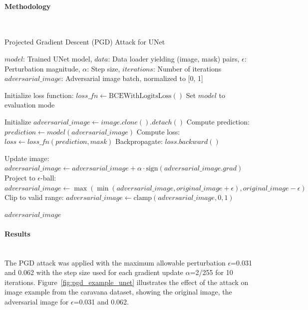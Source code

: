 \documentclass[../main.tex]{subfiles}
\begin{document}
\paragraph{Methodology}\leavevmode\\

\begin{breakablealgorithm}{Projected Gradient Descent (PGD) Attack for UNet}
\begin{algorithmic}[1]
\Require $model$: Trained UNet model, $data$: Data loader yielding (image, mask) pairs, $\epsilon$: Perturbation magnitude, $\alpha$: Step size, $iterations$: Number of iterations
\Ensure $adversarial\_image$: Adversarial image batch, normalized to [0, 1]

\State Initialize loss function: $loss\_fn \gets \text{BCEWithLogitsLoss}()$
\State Set $model$ to evaluation mode

\State Initialize $adversarial\_image \gets image.clone().detach()$
    \State Compute prediction: $prediction \gets model(adversarial\_image)$
    \State Compute loss: $loss \gets loss\_fn(prediction, mask)$
    \State Backpropagate: $loss.backward()$
    
    \State Update image: $adversarial\_image \gets adversarial\_image + \alpha \cdot \text{sign}(adversarial\_image.grad)$
    \State Project to $\epsilon$-ball: $adversarial\_image \gets \max(\min(adversarial\_image, original\_image + \epsilon), original\_image - \epsilon)$
    \State Clip to valid range: $adversarial\_image \gets \text{clamp}(adversarial\_image, 0, 1)$
\EndFor

\State \Return $adversarial\_image$

\end{algorithmic}
\end{breakablealgorithm}
\paragraph{Results}\leavevmode\\

The PGD attack was applied with the maximum allowable perturbation  $\epsilon$=0.031 and 0.062 with the step size used for each gradient update $\alpha$=2/255 for 10 iterations. Figure~\ref{fig:pgd_example_unet} illustrates the effect of the attack on image example from the caravana dataset, showing the original image, the adversarial image for $\epsilon$=0.031 and 0.062.

\end{document}
